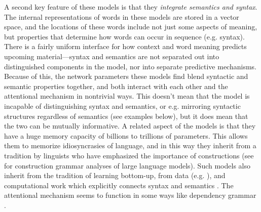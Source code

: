 \documentclass[output=paper,colorlinks,citecolor=brown
]{langscibook}
\begin{document}
A second key feature of these models is that they \emph{integrate semantics and syntax}. The internal representations of words in these models are stored in a vector space, and the locations of these words include not just some aspects of meaning, but properties that determine how words can occur in sequence (e.g. syntax). There is a fairly uniform interface for how context and word meaning predicts upcoming material---syntax and semantics are not separated out into distinguished components in the model, nor into separate predictive mechanisms. Because of this, the network parameters these models find blend syntactic and semantic properties together, and both interact with each other and the attentional mechanism in nontrivial ways. This doesn't mean that the model is incapable of distinguishing syntax and semantics, or e.g. mirroring syntactic structures regardless of semantics (see examples below), but it does mean that the two can be mutually informative. A related aspect of the models is that they have a huge memory capacity of billions to trillions of parameters. This allows them to memorize idiosyncrasies of language, and in this way they inherit from a tradition by linguists who have emphasized the importance of constructions \citep{adele1995constructions,jackendoff2013constructions,goldberg2006constructions,goldberg2003constructions,tomasello2000item,mccauley2019language,tomasello2005constructing,edelman2007behavioral} (see \cite{weissweiler2023construction} for construction grammar analyses of large language models). Such models also inherit from the tradition of learning bottom-up, from data (e.g. \cite{bod2003data,solan2005unsupervised}), and computational work which explicitly connects syntax and semantics \citep{steedman2001syntactic,siskind1996computational,ge2005statistical,kwiatkowski2012probabilistic,liang2009learning}. The attentional mechanism seems to function in some ways like dependency grammar \citep{
tesniere1959elements,hays1964dependency,de2021universal}.
\end{document}
